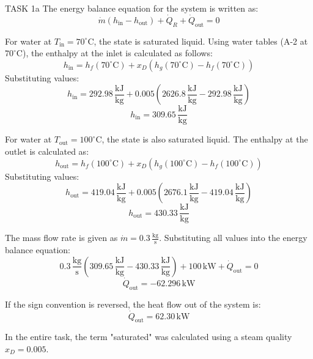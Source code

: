 TASK 1a  
The energy balance equation for the system is written as:  
\[
\dot{m}(h_{\text{in}} - h_{\text{out}}) + \dot{Q}_R + \dot{Q}_{\text{out}} = 0
\]  

For water at \( T_{\text{in}} = 70^\circ\text{C} \), the state is saturated liquid. Using water tables (A-2 at \( 70^\circ\text{C} \)), the enthalpy at the inlet is calculated as follows:  
\[
h_{\text{in}} = h_f(70^\circ\text{C}) + x_D \left( h_g(70^\circ\text{C}) - h_f(70^\circ\text{C}) \right)
\]  
Substituting values:  
\[
h_{\text{in}} = 292.98 \, \frac{\text{kJ}}{\text{kg}} + 0.005 \left( 2626.8 \, \frac{\text{kJ}}{\text{kg}} - 292.98 \, \frac{\text{kJ}}{\text{kg}} \right)
\]  
\[
h_{\text{in}} = 309.65 \, \frac{\text{kJ}}{\text{kg}}
\]  

For water at \( T_{\text{out}} = 100^\circ\text{C} \), the state is also saturated liquid. The enthalpy at the outlet is calculated as:  
\[
h_{\text{out}} = h_f(100^\circ\text{C}) + x_D \left( h_g(100^\circ\text{C}) - h_f(100^\circ\text{C}) \right)
\]  
Substituting values:  
\[
h_{\text{out}} = 419.04 \, \frac{\text{kJ}}{\text{kg}} + 0.005 \left( 2676.1 \, \frac{\text{kJ}}{\text{kg}} - 419.04 \, \frac{\text{kJ}}{\text{kg}} \right)
\]  
\[
h_{\text{out}} = 430.33 \, \frac{\text{kJ}}{\text{kg}}
\]  

The mass flow rate is given as \( \dot{m} = 0.3 \, \frac{\text{kg}}{\text{s}} \). Substituting all values into the energy balance equation:  
\[
0.3 \, \frac{\text{kg}}{\text{s}} \left( 309.65 \, \frac{\text{kJ}}{\text{kg}} - 430.33 \, \frac{\text{kJ}}{\text{kg}} \right) + 100 \, \text{kW} + \dot{Q}_{\text{out}} = 0
\]  
\[
\dot{Q}_{\text{out}} = -62.296 \, \text{kW}
\]  

If the sign convention is reversed, the heat flow out of the system is:  
\[
\dot{Q}_{\text{out}} = 62.30 \, \text{kW}
\]  

In the entire task, the term "saturated" was calculated using a steam quality \( x_D = 0.005 \).